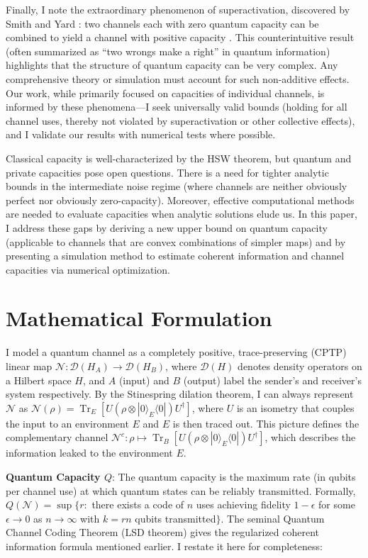 \documentclass[11pt]{article}
\theoremstyle{plain}
\theoremstyle{definition}
\numberwithin{equation}{section}
\begin{document}
Finally, I note the extraordinary phenomenon of superactivation, discovered by Smith and Yard \cite{99}: two channels each with zero quantum capacity can be combined to yield a channel with positive capacity \cite{88}. This counterintuitive result (often summarized as “two wrongs make a right” in quantum information) highlights that the structure of quantum capacity can be very complex. Any comprehensive theory or simulation must account for such non-additive effects. Our work, while primarily focused on capacities of individual channels, is informed by these phenomena—I seek universally valid bounds (holding for all channel uses, thereby not violated by superactivation or other collective effects), and I validate our results with numerical tests where possible.


Classical capacity is well-characterized by the HSW theorem, but quantum and private capacities pose open questions. There is a need for tighter analytic bounds in the intermediate noise regime (where channels are neither obviously perfect nor obviously zero-capacity). Moreover, effective computational methods are needed to evaluate capacities when analytic solutions elude us. In this paper, I address these gaps by deriving a new upper bound on quantum capacity (applicable to channels that are convex combinations of simpler maps) and by presenting a simulation method to estimate coherent information and channel capacities via numerical optimization.


\section{Mathematical Formulation}
I model a quantum channel as a completely positive, trace-preserving (CPTP) linear map $\mathcal{N}: \mathcal{D}(H_A) \to \mathcal{D}(H_B)$, where $\mathcal{D}(H)$ denotes density operators on a Hilbert space $H$, and $A$ (input) and $B$ (output) label the sender’s and receiver’s system respectively. By the Stinespring dilation theorem, I can always represent $\mathcal{N}$ as $\mathcal{N}(\rho) = \operatorname{Tr}_E[U (\rho \otimes |0\rangle_E\langle0|) U^\dagger]$, where $U$ is an isometry that couples the input to an environment $E$ and $E$ is then traced out. This picture defines the complementary channel $\mathcal{N}^c: \rho \mapsto \operatorname{Tr}_B[U (\rho \otimes |0\rangle_E\langle0|) U^\dagger]$, which describes the information leaked to the environment $E$.


\textbf{Quantum Capacity $Q$}: The quantum capacity is the maximum rate (in qubits per channel use) at which quantum states can be reliably transmitted. Formally, $Q(\mathcal{N}) = \sup \{ r:$ there exists a code of $n$ uses achieving fidelity $1-\epsilon$ for some $\epsilon\to0$ as $n\to\infty$ with $k = rn$ qubits transmitted$\}$. The seminal Quantum Channel Coding Theorem (LSD theorem) gives the regularized coherent information formula mentioned earlier. I restate it here for completeness:
\end{document}
